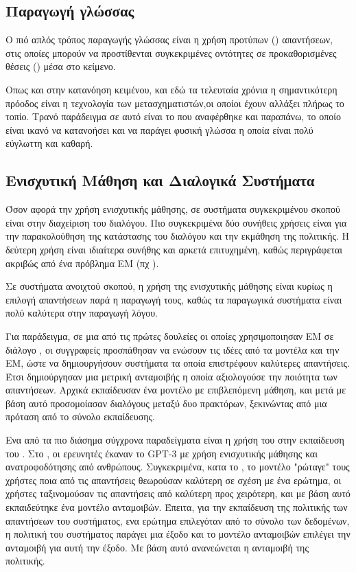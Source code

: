 \subsection{Παραγωγή γλώσσας}

Ο πιό απλός τρόπος παραγωγής γλώσσας είναι η χρήση προτύπων () απαντήσεων, στις οποίες μπορούν να προστίθενται συγκεκριμένες οντότητες σε προκαθορισμένες θέσεις () μέσα στο κείμενο.

Οπως και στην κατανόηση κειμένου, και εδώ τα τελευταία χρόνια η σημαντικότερη πρόοδος είναι η τεχνολογία των μετασχηματιστών,οι οποίοι έχουν αλλάξει πλήρως το τοπίο. Τρανό παράδειγμα σε αυτό είναι το  που αναφέρθηκε και παραπάνω, το οποίο είναι ικανό να κατανοήσει και να παράγει φυσική γλώσσα η οποία είναι πολύ εύγλωττη και καθαρή.

\subsection{Ενισχυτική Μάθηση και Διαλογικά Συστήματα}

Όσον αφορά την χρήση ενισχυτικής μάθησης, σε συστήματα συγκεκριμένου σκοπού είναι στην διαχείριση του διαλόγου. Πιο συγκεκριμένα δύο συνήθεις χρήσεις είναι για την παρακολούθηση της κατάστασης του διαλόγου και την εκμάθηση της πολιτικής. Η δεύτερη χρήση είναι ιδιαίτερα συνήθης και αρκετά επιτυχημένη, καθώς περιγράφεται ακριβώς από ένα πρόβλημα ΕΜ (πχ \cite{policy_learning_2019}).

Σε συστήματα ανοιχτού σκοπού, η χρήση της ενισχυτικής μάθησης είναι κυρίως η επιλογή απαντήσεων παρά η παραγωγή τους, καθώς τα παραγωγικά  συστήματα είναι πολύ καλύτερα στην παραγωγή λόγου.

Για παράδειγμα, σε μια από τις πρώτες δουλείες οι οποίες χρησιμοποιησαν ΕΜ σε διάλογο \cite{rl_dialogue_2016}, οι συγγραφείς προσπάθησαν να ενώσουν τις ιδέες από τα  μοντέλα και την ΕΜ, ώστε να δημιουργήσουν συστήματα τα οποία επιστρέφουν καλύτερες απαντήσεις. Έτσι δημιούργησαν μια μετρική ανταμοιβής η οποία αξιολογούσε την ποιότητα των απαντήσεων. Αρχικά εκπαίδευσαν ένα  μοντέλο με επιβλεπόμενη μάθηση, και μετά με βάση αυτό προσομοίασαν διαλόγους μεταξύ δυο πρακτόρων, ξεκινώντας από μια πρόταση από το σύνολο εκπαίδευσης.

Ενα από τα πιο διάσημα σύγχρονα παραδείγματα είναι η χρήση του στην εκπαίδευση του . Στο \cite{chatgpt_2022}, οι ερευνητές έκαναν  το {GPT-3} με χρήση ενισχυτικής μάθησης και ανατροφοδότησης από ανθρώπους. Συγκεκριμένα, κατα το , το μοντέλο "ρώταγε" τους χρήστες ποια από τις απαντήσεις θεωρούσαν καλύτερη σε σχέση με ένα ερώτημα, οι χρήστες ταξινομούσαν τις απαντήσεις από καλύτερη προς χειρότερη, και με βάση αυτό εκπαιδεύτηκε ένα μοντέλο ανταμοιβών. Έπειτα, για την εκπαίδευση της πολιτικής των απαντήσεων του συστήματος, ενα ερώτημα επιλεγόταν από το σύνολο των δεδομένων, η πολιτική του συστήματος παράγει μια έξοδο και το μοντέλο ανταμοιβών επιλέγει την ανταμοιβή για αυτή την έξοδο. Με βάση αυτό ανανεώνεται η ανταμοιβή της πολιτικής.

